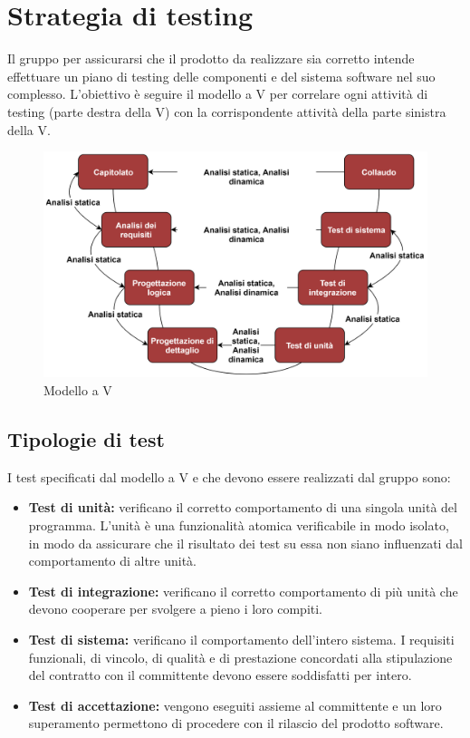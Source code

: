 \section{Strategia di testing}
Il gruppo \Gruppo{} per assicurarsi che il prodotto da realizzare sia corretto intende effettuare un piano di testing delle componenti e del sistema software nel suo complesso.
L'obiettivo è seguire il modello a V per correlare ogni attività di testing (parte destra della V) con la corrispondente attività della parte sinistra della V.

\begin{figure}[h]
    \centering
    \includegraphics[scale=0.85]{sezioni/Immagini/Modello_a_V.png}
    \caption{Modello a V}
\end{figure}

\subsection{Tipologie di test}
I test specificati dal modello a V e che devono essere realizzati dal gruppo sono:
\begin{itemize}
    \item \textbf{Test di unità:} verificano il corretto comportamento di una singola unità del programma. L'unità è una funzionalità atomica verificabile in modo isolato, in modo da assicurare che il risultato dei test su essa non siano influenzati dal comportamento di altre unità. 
    \item \textbf{Test di integrazione:} verificano il corretto comportamento di più unità che devono cooperare per svolgere a pieno i loro compiti.
    \item \textbf{Test di sistema:} verificano il comportamento dell'intero sistema. I requisiti funzionali, di vincolo, di qualità e di prestazione concordati alla stipulazione del contratto con il committente devono essere soddisfatti per intero.
    \item \textbf{Test di accettazione:} vengono eseguiti assieme al committente e un loro superamento permettono di procedere con il rilascio del prodotto software.
\end{itemize}

